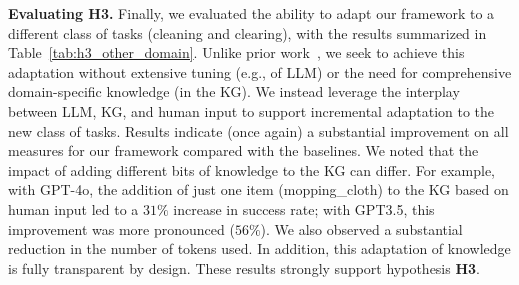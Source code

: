 \vspace{-0.5em}
\noindent
\textbf{Evaluating H3.}
Finally, we evaluated the ability to adapt our framework to a different class of tasks (cleaning and clearing), with the results summarized in Table~\ref{tab:h3_other_domain}. Unlike prior work~\cite{sakib2024cooking}, we seek to achieve this adaptation without extensive tuning (e.g., of LLM) or the need for comprehensive domain-specific knowledge (in the KG). We instead leverage the interplay between LLM, KG, and human input to support incremental adaptation to the new class of tasks. Results indicate (once again) a substantial improvement on all measures for our framework compared with the baselines. We noted that the impact of adding different bits of knowledge to the KG can differ. For example, with GPT-4o, the addition of just one item (mopping\_cloth) to the KG based on human input led to a $31\%$ increase in success rate; with GPT3.5, this improvement was more pronounced ($56\%$). We also observed a substantial reduction in the number of tokens used. In addition, this adaptation of knowledge is fully transparent by design. These results strongly support hypothesis \textbf{H3}. 


